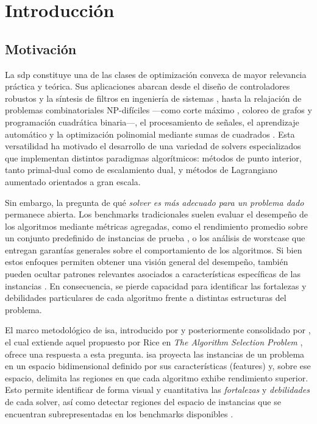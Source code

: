 \chapter{Introducción}
\label{ch:intro}

\section{Motivación} %

La \acrfull{sdp} constituye una de las clases de optimización convexa de mayor relevancia
práctica y teórica.
Sus aplicaciones abarcan desde el diseño de controladores robustos
\parencite{faresROBUSTCONTROLSEQUENTIAL2002} y la síntesis de filtros
en ingeniería de sistemas \parencite{liLinearMatrixInequality1997,wuFIRFilterDesign1996},
hasta la relajación de problemas combinatoriales NP-difíciles —como corte máximo \parencite{goemansImprovedApproximationAlgorithms1995},
coloreo de grafos y programación cuadrática binaria—,
el procesamiento de señales, el aprendizaje automático y la optimización polinomial mediante sumas de cuadrados
\parencite{lasserreGlobalOptimizationPolynomials2001,parriloSemidefiniteProgrammingRelaxations2003}.
Esta versatilidad ha motivado el desarrollo de una variedad de \glspl{solver} especializados que
implementan distintos paradigmas algorítmicos: métodos de punto interior, tanto primal-dual
como de escalamiento dual, y métodos de Lagrangiano aumentado orientados a gran escala.

Sin embargo, la pregunta de qué \textit{solver es más adecuado para un problema dado}
permanece abierta.
Los \glspl{benchmark} tradicionales suelen evaluar el desempeño de los algoritmos mediante métricas
agregadas, como el rendimiento promedio sobre un conjunto predefinido de instancias de
prueba \parencite{dolanBenchmarkingOptimizationSoftware2002}, o los
análisis de \gls{worstcase} que entregan garantías generales sobre el comportamiento de los algoritmos.
Si bien estos enfoques permiten obtener una visión general del desempeño, también pueden
ocultar patrones relevantes asociados a características específicas de las
instancias \parencite{hookerTestingHeuristicsWe1995a,smith-milesObjectiveMeasuresAlgorithm2014a}.
En consecuencia, se pierde capacidad para identificar las fortalezas y debilidades
particulares de cada algoritmo frente a distintas estructuras del problema.

El marco metodológico de \acrfull{isa}, introducido por \textcite{smith-milesObjectiveMeasuresAlgorithm2014a}
y posteriormente consolidado por \textcite{smith-milesInstanceSpaceAnalysis2023a},
el cual extiende aquel propuesto por Rice en \textit{The Algorithm Selection Problem} \parencite{riceAlgorithmSelectionProblem1976},
ofrece una respuesta a esta pregunta.
\acrshort{isa} proyecta las instancias de un problema en un espacio bidimensional definido
por sus características (\glspl{feature}) y, sobre ese espacio, delimita las regiones en que
cada algoritmo exhibe rendimiento superior.
Esto permite identificar de forma visual y cuantitativa las \textit{fortalezas} y
\textit{debilidades} de cada \gls{solver}, así como detectar regiones del espacio de instancias
que se encuentran subrepresentadas en los \glspl{benchmark}
disponibles \parencite{smith-milesInstanceSpaceAnalysis2023a}.

